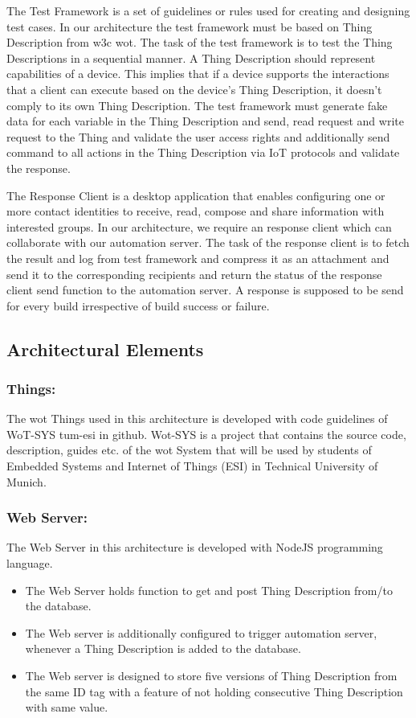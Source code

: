 \documentclass[conference]{IEEEtran}
\theoremstyle{definition}
\begin{document}
The Test Framework is a set of guidelines or rules used for creating and designing test cases. In our architecture the test framework must be based on Thing Description from \ac{w3c} \ac{wot}. 
The task of the test framework is to test the Thing Descriptions in a sequential manner. 
A Thing Description should represent capabilities of a device. 
This implies that if a device supports the interactions that a client can execute based on the device's Thing Description, it doesn't comply to its own Thing Description. 
The test framework must generate fake data for each variable in the Thing Description and send, read request and write request to the Thing and validate the user access rights and additionally send command to all actions in the Thing Description via IoT protocols and validate the response. 

The Response Client is a desktop application that enables configuring one or more contact identities to receive, read, compose and share information with interested groups. 
In our architecture, we require an response client which can collaborate with our automation server. 
The task of the response client is to fetch the result and log from test framework and compress it as an attachment and send it to the corresponding recipients and return the status of the response client send function to the automation server. 
A response is supposed to be send for every build irrespective of build success or failure.

\subsection{Architectural Elements}

\subsubsection{Things:}

The \ac{wot} Things used in this architecture is developed with code guidelines of WoT-SYS tum-esi in github. 
Wot-SYS is a project that contains the source code, description, guides etc. of the \ac{wot} System that will be used by students of Embedded Systems and Internet of Things (ESI) in Technical University of Munich.

\subsubsection{Web Server:}
  
The Web Server in this architecture is developed with NodeJS programming language. 
\begin{itemize}
  \item The Web Server holds function to get and post Thing Description from/to the database.
  \item The Web server is additionally configured to trigger automation server, whenever a Thing Description is added to the database.
  \item The Web server is designed to store five versions of Thing Description from the same ID tag with a feature of not holding consecutive Thing Description with same value.
\end{itemize} 
\end{document}
